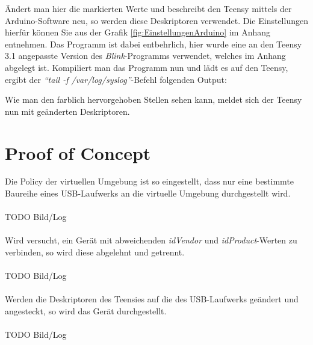 \lstset{language=C}


Ändert man hier die markierten Werte und beschreibt den Teensy mittels der Arduino-Software neu, so werden diese Deskriptoren verwendet. Die Einstellungen hierfür können Sie aus der Grafik \ref{fig:EinstellungenArduino} im Anhang entnehmen. Das Programm ist dabei entbehrlich, hier wurde eine an den Teensy 3.1 angepasste Version des \textit{Blink}-Programms verwendet, welches im Anhang abgelegt ist. Kompiliert man das Programm nun und lädt es auf den Teensy, ergibt der \textit{"`tail -f /var/log/syslog"'}-Befehl folgenden Output:

\lstset{language=log}


Wie man den farblich hervorgehoben Stellen sehen kann, meldet sich der Teensy nun mit geänderten Deskriptoren.

\section{Proof of Concept} \label{PoC}
Die Policy der virtuellen Umgebung ist so eingestellt, dass nur eine  bestimmte Baureihe eines USB-Laufwerks an die virtuelle Umgebung durchgestellt wird.\\
\\
TODO Bild/Log\\
\\
Wird versucht, ein Gerät mit abweichenden \textit{idVendor} und \textit{idProduct}-Werten zu verbinden, so wird diese abgelehnt und getrennt.\\
\\
TODO Bild/Log\\
\\
Werden die Deskriptoren des Teensies auf die des USB-Laufwerks geändert und angesteckt, so wird das Gerät durchgestellt.\\
\\
TODO Bild/Log